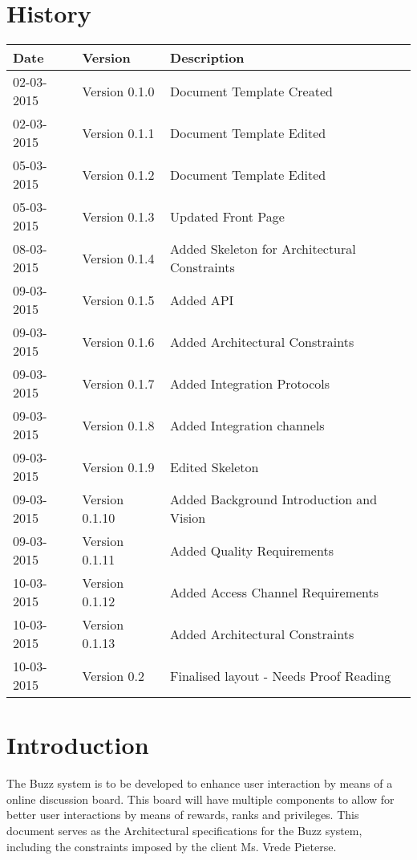 \documentclass[10pt]{article}
\begin{document}


\section{History}
\begin{tabular}{|l|l|l|}

\hline
Date & Version & Description\\ %
\hline
02-03-2015 & Version 0.1.0 & Document Template Created\\ %
02-03-2015 & Version 0.1.1 & Document Template Edited\\ %
05-03-2015 & Version 0.1.2 & Document Template Edited\\ %
05-03-2015 & Version 0.1.3 & Updated Front Page \\ %
08-03-2015 & Version 0.1.4 & Added Skeleton for Architectural Constraints \\ %
09-03-2015 & Version 0.1.5 & Added API \\ %
09-03-2015 & Version 0.1.6 & Added Architectural Constraints \\ %
09-03-2015 & Version 0.1.7 & Added Integration Protocols \\ %
09-03-2015 & Version 0.1.8 & Added Integration channels  \\ %
09-03-2015 & Version 0.1.9 & Edited Skeleton \\ %
09-03-2015 & Version 0.1.10 & Added Background Introduction and Vision \\ %
09-03-2015 & Version 0.1.11 & Added Quality Requirements \\ %
10-03-2015 & Version 0.1.12 & Added Access Channel Requirements \\ %
10-03-2015 & Version 0.1.13 & Added Architectural Constraints \\ %
10-03-2015 & Version 0.2 & Finalised layout - Needs Proof Reading \\ %
\end{tabular}
\newpage
\tableofcontents
\newpage

\section{Introduction}
The Buzz system is to be developed to enhance user interaction by means of a online discussion board. This board will have multiple components to allow for better user interactions by means of rewards, ranks and privileges. This document serves as the Architectural specifications for the Buzz system, including the constraints imposed by the client Ms. Vrede Pieterse.
\end{document}
